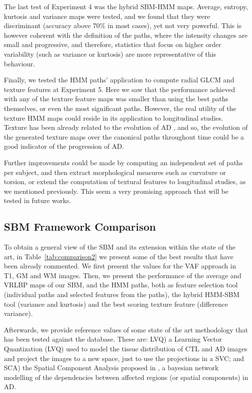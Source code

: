 The last test of Experiment 4 was the hybrid \ac{SBM}-\ac{HMM} maps. Average, entropy, kurtosis and variance maps were tested, and we found that they were discriminant (accuracy above 70\% in most cases), yet not very powerful. This is however coherent with the definition of the paths, where the intensity changes are small and progressive, and therefore, statistics that focus on higher order variability (such as variance or kurtosis) are more representative of this behaviour. 

Finally, we tested the \ac{HMM} paths' application to compute radial \ac{GLCM} and texture features at Experiment 5. Here we saw that the performance achieved with any of the texture feature maps was smaller than using the best paths themselves, or even the most significant paths. However, the real utility of the texture \ac{HMM} maps could reside in its application to longitudinal studies. Texture has been already related to the evolution of \ac{AD} \cite{sikio2015mr}, and so, the evolution of the generated texture maps over the canonical paths throughout time could be a good indicator of the progression of \ac{AD}. 

Further improvements could be made by computing an independent set of paths per subject, and then extract morphological measures such as curvature or torsion, or extend the computation of textural features to longitudinal studies, as we mentioned previously. This seem a very promising approach that will be tested in future works. 

\subsection{\acs{SBM} Framework Comparison}
To obtain a general view of the \ac{SBM} and its extension within the state of the art, in Table~\ref{tab:comparison2} we present some of the best results that have been already commented. We first present the values for the \ac{VAF} approach \cite{Stoeckel04} in T1, \ac{GM} and \ac{WM} images. Then, we present the performance of the average and \ac{VRLBP} maps of our \ac{SBM}, and the \ac{HMM} paths, both as feature selection tool (individual paths and selected features from the paths), the hybrid \ac{HMM}-\ac{SBM} tool (variance and kurtosis) and the best scoring texture feature (difference variance). 

Afterwards, we provide reference values of some state of the art methodology that has been tested against the \adnimri{} database. These are: LVQ) a Learning Vector Quantization (LVQ) \cite{Ortiz2013} used to model the tissue distribution of \ac{CTL} and \ac{AD} images and project the images to a new space, just to use the projections in a \ac{SVC}; and SCA) the Spatial Component Analysis proposed in \cite{Illan2014}, a bayesian network modelling of the dependencies between affected regions (or spatial components) in \ac{AD}. 

